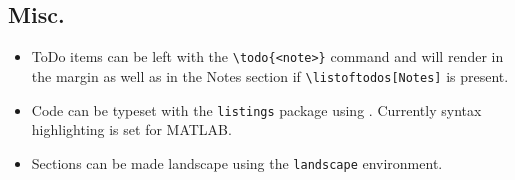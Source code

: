 \subsection{Misc.}
\begin{itemize}
    \item ToDo items can be left with the \verb|\todo{<note>}| command and will render in the margin as well as in the Notes section if \verb|\listoftodos[Notes]| is present. 
    \item Code can be typeset with the \verb|listings| package using \verb||. Currently syntax highlighting is set for MATLAB.
    \item Sections can be made landscape using the \verb|landscape| environment.
\end{itemize}